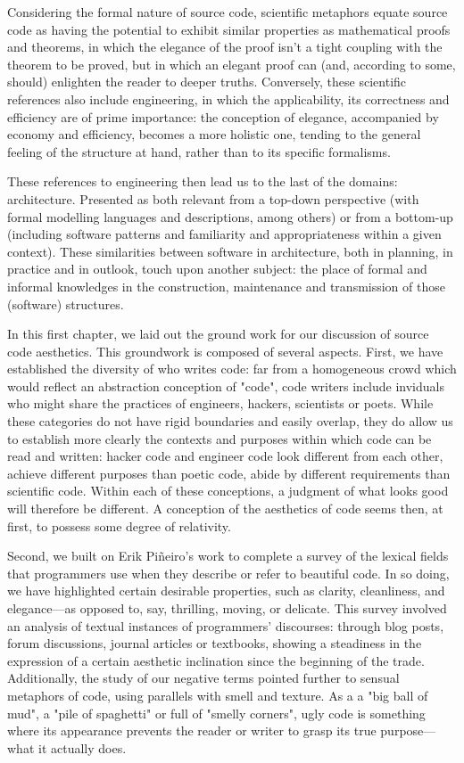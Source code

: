 Considering the formal nature of source code, scientific metaphors equate source code as having the potential to exhibit similar properties as mathematical proofs and theorems, in which the elegance of the proof isn't a tight coupling with the theorem to be proved, but in which an elegant proof can (and, according to some, should) enlighten the reader to deeper truths. Conversely, these scientific references also include engineering, in which the applicability, its correctness and efficiency are of prime importance: the conception of elegance, accompanied by economy and efficiency, becomes a more holistic one, tending to the general feeling of the structure at hand, rather than to its specific formalisms.

These references to engineering then lead us to the last of the domains: architecture. Presented as both relevant from a top-down perspective (with formal modelling languages and descriptions, among others) or from a bottom-up (including software patterns and familiarity and appropriateness within a given context). These similarities between software in architecture, both in planning, in practice and in outlook, touch upon another subject: the place of formal and informal knowledges in the construction, maintenance and transmission of those (software) structures.

\spacer

In this first chapter, we laid out the ground work for our discussion of source code aesthetics. This groundwork is composed of several aspects. First, we have established the diversity of who writes code: far from a homogeneous crowd which would reflect an abstraction conception of "code", code writers include inviduals who might share the practices of engineers, hackers, scientists or poets. While these categories do not have rigid boundaries and easily overlap, they do allow us to establish more clearly the contexts and purposes within which code can be read and written: hacker code and engineer code look different from each other, achieve different purposes than poetic code, abide by different requirements than scientific code. Within each of these conceptions, a judgment of what looks good will therefore be different. A conception of the aesthetics of code seems then, at first, to possess some degree of relativity.

Second, we built on Erik Piñeiro's work to complete a survey of the lexical fields that programmers use when they describe or refer to beautiful code. In so doing, we have highlighted certain desirable properties, such as clarity, cleanliness, and elegance—as opposed to, say, thrilling, moving, or delicate. This survey involved an analysis of textual instances of programmers' discourses: through blog posts, forum discussions, journal articles or textbooks, showing a steadiness in the expression of a certain aesthetic inclination since the beginning of the trade. Additionally, the study of our negative terms pointed further to sensual metaphors of code, using parallels with smell and texture. As a a "big ball of mud", a "pile of spaghetti" or full of "smelly corners", ugly code is something where its appearance prevents the reader or writer to grasp its true purpose—what it actually does.

